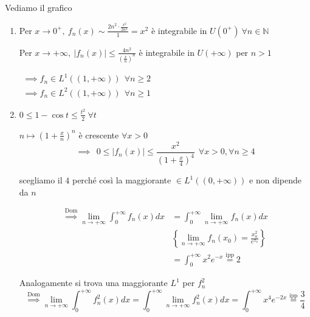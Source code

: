 Vediamo il grafico

\begin{enumerate}
\item Per $x\rightarrow 0^{+} ,\ f_{n}( x) \sim \frac{2n^{2} \cdotp \frac{x^{2}}{2n^{2}}}{1} =x^{2}$ è integrabile in $U\left( 0^{+}\right) \ \forall n\in \mathbb{N}$

Per $x\rightarrow +\infty ,\ | f_{n}( x)| \leqslant \frac{4n^{2}}{\left(\frac{x}{n}\right)^{n}}$ è integrabile in $U( +\infty )$ per $n >1$

$ \begin{array}{l}
\implies f_{n} \in L^{1}(( 1,+\infty )) \ \ \forall n\geqslant 2\\
\implies f_{n} \in L^{2}(( 1,+\infty )) \ \ \forall n\geqslant 1
\end{array}$
\item $0\leqslant 1-\cos t\leqslant \frac{t^{2}}{2} \ \forall t$

$n\mapsto \left( 1+\frac{x}{n}\right)^{n}$ è crescente $\forall x >0$\begin{equation*}
\implies \ \ 0\leqslant | f_{n} (x)| \leqslant \frac{x^{2}}{\left( 1+\frac{x}{4}\right)^{4}} \ \ \forall x >0,\forall n\geqslant 4
\end{equation*}

scegliamo il $4$ perché così la maggiorante $\in L^{1}(( 0,+\infty ))$ e non dipende da $n$

\begin{equation*}
\begin{aligned}
\overset{\text{Dom}}{\implies }\lim\limits _{n\rightarrow +\infty }\int ^{+\infty }_{0} f_{n}( x) dx & =\int ^{+\infty }_{0}\lim\limits _{n\rightarrow +\infty } f_{n}( x) dx\\
 & \left\{\lim\limits _{n\rightarrow +\infty } f_{n}( x_{0}) =\frac{x^{2}_{0}}{e^{x_{0}}}\right\}\\
 & =\int ^{+\infty }_{0} x^{2} e^{-x}\overset{\text{ipp}}{=} 2
\end{aligned}
\end{equation*}

Analogamente si trova una maggiorante $L^{1}$ per $f^{2}_{n}$\begin{equation*}
\overset{\text{Dom}}{\implies }\lim\limits _{n\rightarrow +\infty }\int ^{+\infty }_{0} f^{2}_{n}( x) dx=\int ^{+\infty }_{0}\lim\limits _{n\rightarrow +\infty } f^{2}_{n}( x) dx=\int ^{+\infty }_{0} x^{4} e^{-2x}\overset{\text{ipp}}{=}\frac{3}{4}
\end{equation*}
\end{enumerate}
